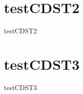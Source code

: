 \section{testCDST2}
\label{sec:datasets:testCDST2}
\begin{datasetDescription}{testCDST2}
\end{datasetDescription}

\section{testCDST3}
\label{sec:datasets:testCDST3}
\begin{datasetDescription}{testCDST3}
\end{datasetDescription}

